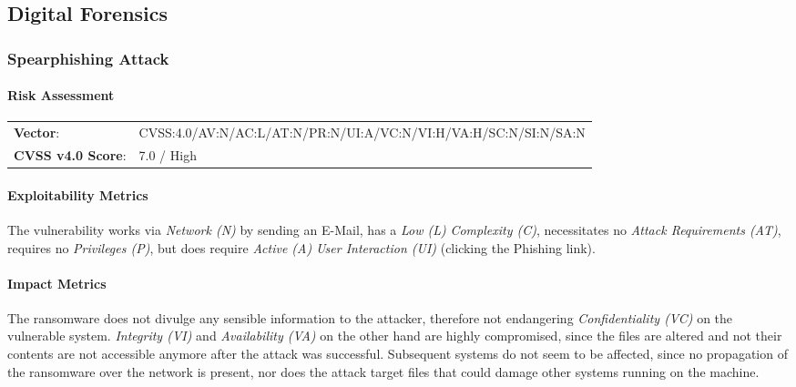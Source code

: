\documentclass[../report.tex]{subfiles}
\begin{document}
\subsection{Digital Forensics}
\subsubsection{Spearphishing Attack}

\paragraph{Risk Assessment}

\begin{tabular}{l l}
\textbf{Vector}: & CVSS:4.0/AV:N/AC:L/AT:N/PR:N/UI:A/VC:N/VI:H/VA:H/SC:N/SI:N/SA:N\\
\textbf{CVSS v4.0 Score}: & 7.0 / High
\end{tabular}

\paragraph*{Exploitability Metrics}
The vulnerability works via \textit{Network (N)} by sending an E-Mail, has a \textit{Low (L)} \textit{Complexity (C)}, necessitates no \textit{Attack Requirements (AT)}, requires no \textit{Privileges (P)}, but does require \textit{Active (A)} \textit{User Interaction (UI)} (clicking the Phishing link).

\paragraph*{Impact Metrics}
The ransomware does not divulge any sensible information to the attacker, therefore not endangering \textit{Confidentiality (VC)} on the vulnerable system.
\textit{Integrity (VI)} and \textit{Availability (VA)} on the other hand are highly compromised, since the files are altered and not their contents are not accessible anymore after the attack was successful. Subsequent systems do not seem to be affected, since no propagation of the ransomware over the network is present, nor does the attack target files that could damage other systems running on the machine.

\newpage
\end{document}
